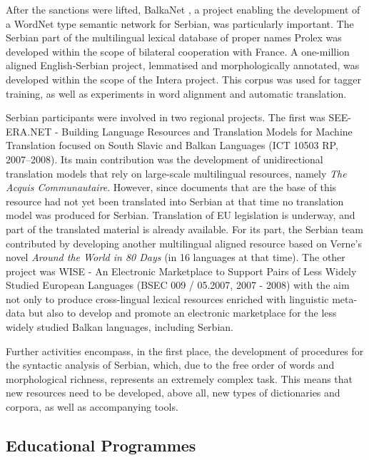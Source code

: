 \begin{multicols}{2}
After the sanctions were lifted, BalkaNet \cite{CORDIS}, a project enabling the development of a WordNet type semantic network for Serbian, was particularly important. The Serbian part of the multilingual lexical database of proper names Prolex \cite{CNRTL} was developed within the scope of bilateral cooperation with France. A one-million aligned English-Serbian project, lemmatised and morphologically annotated, was developed within the scope of the Intera project.  This corpus was used for tagger training, as well as experiments in word alignment and automatic translation. 

Serbian participants were involved in two regional projects. The first was SEE-ERA.NET - Building Language Resources and Translation Models for Machine Translation focused on South Slavic and Balkan Languages (ICT 10503 RP, 2007--2008). Its main contribution was the development of unidirectional translation models that rely on large-scale multilingual resources, namely \textit{The Acquis Communautaire}. However, since documents that are the base of this resource had not yet been translated into Serbian at that time no translation model was produced for Serbian. Translation of EU legislation is underway, and part of the translated material is already available. \cite{PREVODJENJE} For its part, the Serbian team contributed by developing another multilingual aligned resource based on Verne’s novel \textit{Around the World in 80 Days} (in 16 languages at that time).  The other project was WISE - An Electronic Marketplace to Support Pairs of Less Widely Studied European Languages (BSEC 009 / 05.2007, 2007 - 2008) with the aim not only to produce cross-lingual lexical resources enriched with linguistic meta-data but also to develop and promote an electronic marketplace for the less widely studied Balkan languages, including Serbian.

Further activities encompass, in the first place, the development of procedures for the syntactic analysis of Serbian, which, due to the free order of words and morphological richness, represents an extremely complex task. This means that new resources need to be developed, above all, new types of dictionaries and corpora, as well as accompanying tools.  

 \subsection {Educational Programmes}


\end{multicols}
